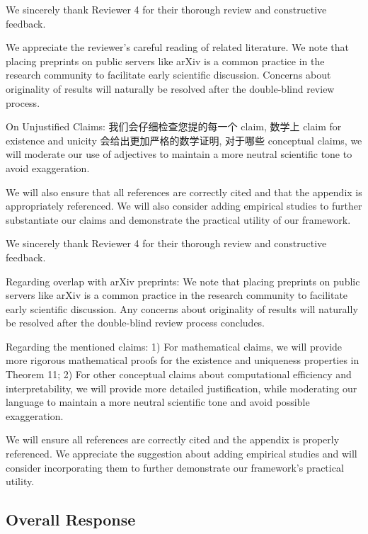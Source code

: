 \documentclass[letterpaper]{article} %
\begin{document}
\begin{CJK*}{UTF8}{gbsn}
We sincerely thank Reviewer 4 for their thorough review and constructive feedback.


We appreciate the reviewer's careful reading of related literature. We note that placing preprints on public servers like arXiv is a common practice in the research community to facilitate early scientific discussion. Concerns about originality of results will naturally be resolved after the double-blind review process.


On Unjustified Claims: 
我们会仔细检查您提的每一个 claim, 数学上 claim for  existence and unicity 会给出更加严格的数学证明, 对于哪些 conceptual claims, we will moderate our use of adjectives to maintain a more neutral scientific tone to avoid exaggeration.


We will also ensure that all references are correctly cited and that the appendix is appropriately referenced. We will also consider adding empirical studies to further substantiate our claims and demonstrate the practical utility of our framework.



We sincerely thank Reviewer 4 for their thorough review and constructive feedback.

Regarding overlap with arXiv preprints: We note that placing preprints on public servers like arXiv is a common practice in the research community to facilitate early scientific discussion. Any concerns about originality of results will naturally be resolved after the double-blind review process concludes.


Regarding the mentioned claims: 1) For mathematical claims, we will provide more rigorous mathematical proofs for the existence and uniqueness properties in Theorem 11; 2) For other conceptual claims about computational efficiency and interpretability, we will provide more detailed justification, while moderating our language to maintain a more neutral scientific tone and avoid possible exaggeration.


We will ensure all references are correctly cited and the appendix is properly referenced. We appreciate the suggestion about adding empirical studies and will consider incorporating them to further demonstrate our framework's practical utility.



\subsection{Overall Response}

\end{CJK*}  %
\end{document}
